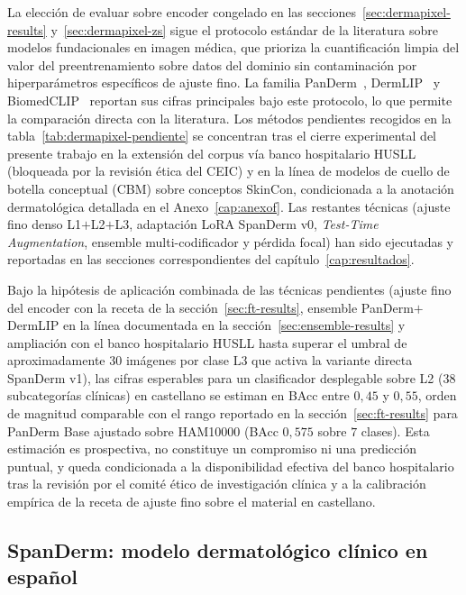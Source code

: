 La elección de evaluar sobre encoder congelado en las
secciones~\ref{sec:dermapixel-results} y~\ref{sec:dermapixel-zs}
sigue el protocolo estándar de la literatura sobre modelos
fundacionales en imagen médica, que prioriza la cuantificación
limpia del valor del preentrenamiento sobre datos del dominio sin
contaminación por hiperparámetros específicos de ajuste fino. La
familia PanDerm~\cite{panderm2025}, DermLIP~\cite{derm1m} y
BiomedCLIP~\cite{biomedclip} reportan sus cifras principales bajo
este protocolo, lo que permite la comparación directa con la
literatura. Los métodos pendientes recogidos en la
tabla~\ref{tab:dermapixel-pendiente} se concentran tras el cierre
experimental del presente trabajo en la extensión del corpus vía
banco hospitalario HUSLL (bloqueada por la revisión ética del
CEIC) y en la línea de modelos de cuello de botella conceptual
(CBM) sobre conceptos SkinCon, condicionada a la anotación
dermatológica detallada en el Anexo~\ref{cap:anexof}. Las
restantes técnicas (ajuste fino denso L1$+$L2$+$L3,
adaptación LoRA SpanDerm v0, \emph{Test-Time Augmentation},
ensemble multi-codificador y pérdida focal) han sido ejecutadas y
reportadas en las secciones correspondientes del
capítulo~\ref{cap:resultados}.

Bajo la hipótesis de aplicación combinada de las técnicas
pendientes (ajuste fino del encoder con la receta de la
secci\'on~\ref{sec:ft-results}, ensemble PanDerm$+$DermLIP en la
línea documentada en la secci\'on~\ref{sec:ensemble-results} y
ampliación con el banco hospitalario HUSLL hasta superar el umbral
de aproximadamente $30$ imágenes por clase L3 que activa la
variante directa SpanDerm v1), las cifras esperables para un
clasificador desplegable sobre L2 ($38$ subcategorías clínicas)
en castellano se estiman en BAcc entre $0{,}45$ y $0{,}55$,
orden de magnitud comparable con el rango reportado en la
secci\'on~\ref{sec:ft-results} para PanDerm Base ajustado sobre
HAM10000 (BAcc $0{,}575$ sobre $7$ clases). Esta estimación es
prospectiva, no constituye un compromiso ni una predicción puntual,
y queda condicionada a la disponibilidad efectiva del banco
hospitalario tras la revisión por el comité ético de investigación
clínica y a la calibración empírica de la receta de ajuste fino
sobre el material en castellano.

\subsection{SpanDerm: modelo dermatológico clínico en español}
\label{sec:linea-spanderm}

